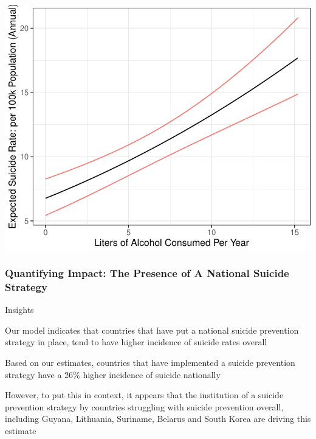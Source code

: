 \documentclass[]{article}
\begin{document}
\begin{center}\includegraphics{Project_Report_files/figure-latex/a_alc_plot-1} \end{center}

\subsubsection{Quantifying Impact: The Presence of A National Suicide
Strategy}\label{quantifying-impact-the-presence-of-a-national-suicide-strategy}

Insights

Our model indicates that countries that have put a national suicide
prevention strategy in place, tend to have higher incidence of suicide
rates overall

Based on our estimates, countries that have implemented a suicide
prevention strategy have a 26\% higher incidence of suicide nationally

However, to put this in context, it appears that the institution of a
suicide prevention strategy by countries struggling with suicide
prevention overall, including Guyana, Lithuania, Suriname, Belarus and
South Korea are driving this estimate
\end{document}
